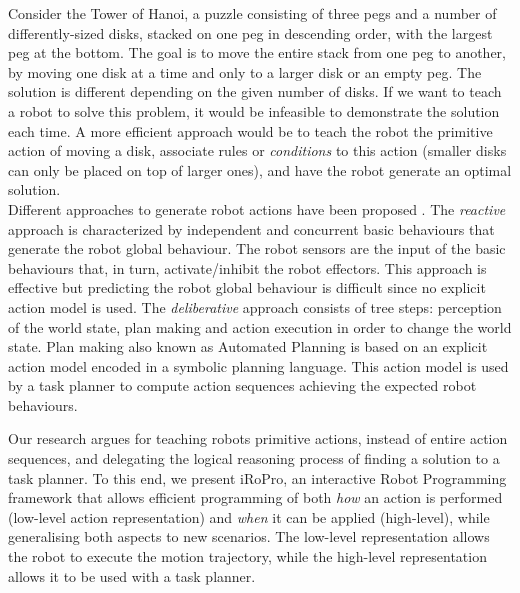 Consider the Tower of Hanoi, a puzzle consisting of three pegs and a number of differently-sized disks, stacked on one peg in descending order, with the largest peg at the bottom.
The goal is to move the entire stack from one peg to another, by moving one disk at a time and only to a larger disk or an empty peg. 
The solution is different depending on the given number of disks.
If we want to teach a robot to solve this problem, it would be infeasible to demonstrate the solution each time.
A more efficient approach would be to teach the robot the primitive action of moving a disk, associate rules or \textit{conditions} to this action (\eg smaller disks can only be placed on top of larger ones), and have the robot generate an optimal solution.\\

Different approaches to generate robot actions have been proposed \cite{8523933}. The {\it reactive} approach is characterized by independent and concurrent basic behaviours that generate the robot global behaviour. The robot sensors are the input of the basic behaviours that, in turn, activate/inhibit the robot effectors. This approach is effective but predicting the robot global behaviour is difficult since no explicit action model is used. The {\it deliberative} approach consists of tree steps: perception of the world state, plan making and action execution in order to change the world state. Plan making also known as Automated Planning \cite{ghallab2004automated} is based on an explicit action model encoded in a symbolic planning language. This action model is used by a task planner to compute action sequences achieving the expected robot behaviours.

Our research argues for teaching robots primitive actions, instead of entire action sequences, and delegating the logical reasoning process of finding a solution to a task planner.
To this end, we present iRoPro, an interactive Robot Programming framework that allows efficient programming of both \textit{how} an action is performed (low-level action representation) and \textit{when} it can be applied (high-level), while generalising both aspects to new scenarios.
The low-level representation allows the robot to execute the motion trajectory, while the high-level representation allows it to be used with a task planner.

